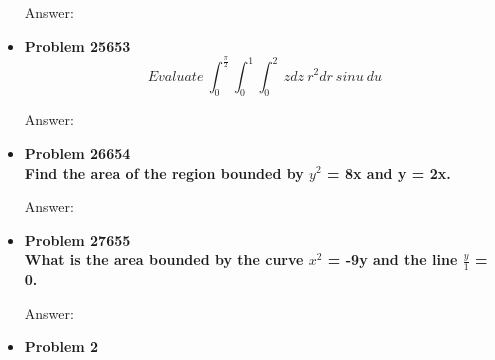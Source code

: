 \documentclass{article}
\begin{document}
\begin{itemize}
    Answer:

    \item\textbf{Problem 25653}\\
        \begin{equation}
        Evaluate\ \int_{0}^{\frac{\pi}{2}}\int_{0}^{1}\int_{0}^{2}\ zdz\  r^2dr\ sinu\ du             
        \end{equation}

    Answer: 

    \item\textbf{Problem 26654\\
    Find the area of the region bounded by $y^2$ = 8x and y = 2x.}

    Answer:

    \item\textbf{Problem 27655\\
    What is the area bounded by the curve $x^2$ = -9y and the line $\frac{y}{1}$ = 0.}

    Answer:

    \item\textbf{Problem 2}

    
\end{itemize}
\end{document}
